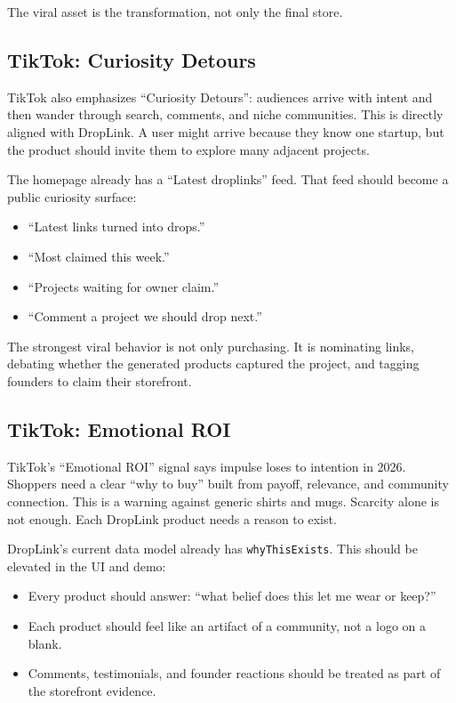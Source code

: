 \documentclass[11pt]{article}
\begin{document}
The viral asset is the transformation, not only the final store.

\subsection{TikTok: Curiosity Detours}

TikTok also emphasizes ``Curiosity Detours'': audiences arrive with intent and then wander through search, comments, and niche communities. This is directly aligned with DropLink. A user might arrive because they know one startup, but the product should invite them to explore many adjacent projects.

The homepage already has a ``Latest droplinks'' feed. That feed should become a public curiosity surface:

\begin{itemize}
  \item ``Latest links turned into drops.''
  \item ``Most claimed this week.''
  \item ``Projects waiting for owner claim.''
  \item ``Comment a project we should drop next.''
\end{itemize}

The strongest viral behavior is not only purchasing. It is nominating links, debating whether the generated products captured the project, and tagging founders to claim their storefront.

\subsection{TikTok: Emotional ROI}

TikTok's ``Emotional ROI'' signal says impulse loses to intention in 2026. Shoppers need a clear ``why to buy'' built from payoff, relevance, and community connection. This is a warning against generic shirts and mugs. Scarcity alone is not enough. Each DropLink product needs a reason to exist.

DropLink's current data model already has \texttt{whyThisExists}. This should be elevated in the UI and demo:

\begin{itemize}
  \item Every product should answer: ``what belief does this let me wear or keep?''
  \item Each product should feel like an artifact of a community, not a logo on a blank.
  \item Comments, testimonials, and founder reactions should be treated as part of the storefront evidence.
\end{itemize}
\end{document}
